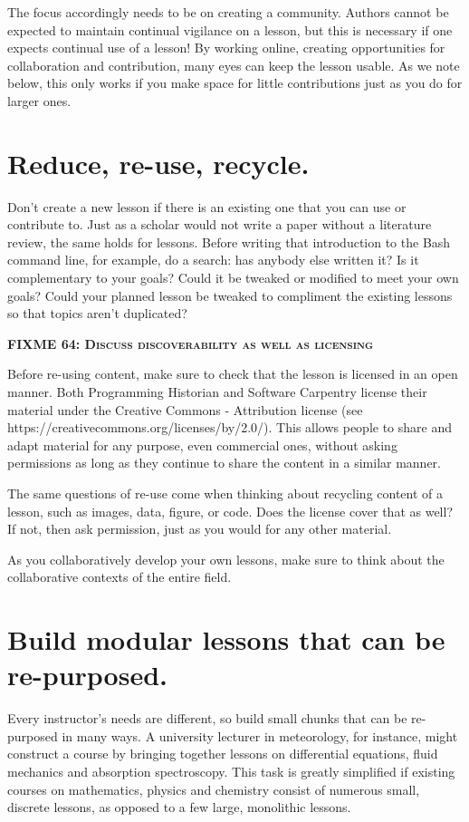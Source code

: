\documentclass[10pt,letterpaper]{article}
\newcommand{\fixme}[2]{\textsc{\textbf{FIXME {#1}: {#2}}}}
\newcommand{\rulemajor}[1]{\section{#1}}
\begin{document}
The focus accordingly needs to be on creating a community.
Authors cannot be expected to maintain continual vigilance on a lesson,
but this is necessary if one expects continual use of a lesson!
By working online, creating opportunities for collaboration
and contribution, many eyes can keep the lesson usable.
As we note below,
this only works if you make space for
little contributions just as you do for larger ones.

\rulemajor{Reduce, re-use, recycle.}

Don't create a new lesson if there is an existing one that you can use or contribute to.
Just as a scholar would not write a paper without a literature review,
the same holds for lessons.
Before writing that introduction to the Bash command line,
for example,
do a search:
has anybody else written it?
Is it complementary to your goals?
Could it be tweaked or modified to meet your own goals?
Could your planned lesson be tweaked to compliment the existing lessons so that topics aren't duplicated?

\fixme{64}{Discuss discoverability as well as licensing}

Before re-using content,
make sure to check that the lesson is licensed in an open manner.
Both Programming Historian and Software Carpentry license their material under
the Creative Commons - Attribution license
(see https://creativecommons.org/licenses/by/2.0/).
This allows people to share and adapt material for any purpose,
even commercial ones,
without asking permissions as long as they continue to share the content in a similar manner.

The same questions of re-use come when thinking about recycling content of a lesson,
such as images, data, figure, or code.
Does the license cover that as well?
If not,
then ask permission,
just as you would for any other material.

As you collaboratively develop your own lessons,
make sure to think about the collaborative contexts of the entire field.

\rulemajor{Build modular lessons that can be re-purposed.}

Every instructor's needs are different,
so build small chunks that can be re-purposed in many ways.
A university lecturer in meteorology, for instance,
might construct a course by bringing together lessons on differential equations,
fluid mechanics and absorption spectroscopy.
This task is greatly simplified if existing courses on mathematics,
physics and chemistry consist of numerous small, discrete lessons,
as opposed to a few large, monolithic lessons.
\end{document}
